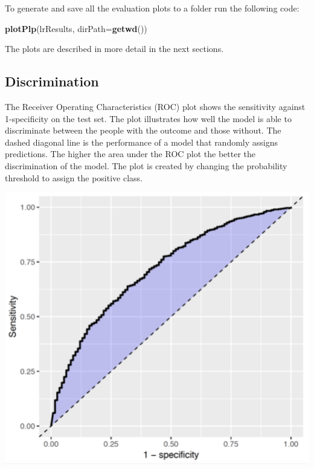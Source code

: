 \documentclass[]{book}
\newenvironment{Shaded}{\begin{snugshade}}{\end{snugshade}}
\newcommand{\KeywordTok}[1]{\textcolor[rgb]{0.13,0.29,0.53}{\textbf{#1}}}
\newcommand{\DataTypeTok}[1]{\textcolor[rgb]{0.13,0.29,0.53}{#1}}
\newcommand{\NormalTok}[1]{#1}
\begin{document}
To generate and save all the evaluation plots to a folder run the
following code:

\begin{Shaded}
\begin{Highlighting}[]
\KeywordTok{plotPlp}\NormalTok{(lrResults, }\DataTypeTok{dirPath=}\KeywordTok{getwd}\NormalTok{())}
\end{Highlighting}
\end{Shaded}

The plots are described in more detail in the next sections.

\newpage

\subsection{Discrimination}\label{discrimination}

The Receiver Operating Characteristics (ROC) plot shows the sensitivity
against 1-specificity on the test set. The plot illustrates how well the
model is able to discriminate between the people with the outcome and
those without. The dashed diagonal line is the performance of a model
that randomly assigns predictions. The higher the area under the ROC
plot the better the discrimination of the model. The plot is created by
changing the probability threshold to assign the positive class.

\includegraphics{images/PatientLevelPrediction/sparseROC.png}
\end{document}
